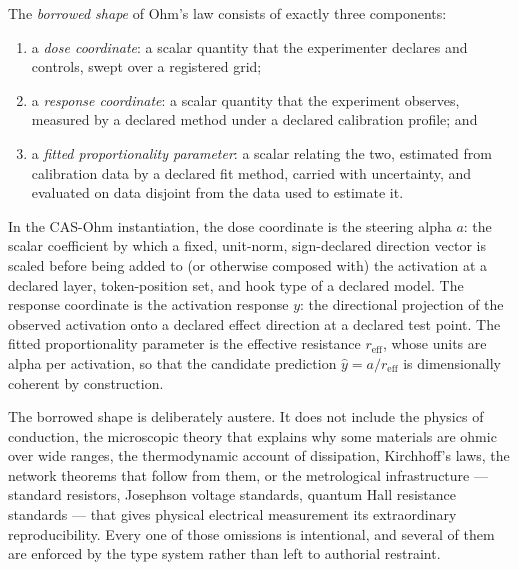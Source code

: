 \begin{definition}\label{ch01:def:shape}
The \emph{borrowed shape} of Ohm's law consists of exactly three components:
\begin{enumerate}
\item a \emph{dose coordinate}: a scalar quantity that the experimenter declares and controls, swept over a registered grid;
\item a \emph{response coordinate}: a scalar quantity that the experiment observes, measured by a declared method under a declared calibration profile; and
\item a \emph{fitted proportionality parameter}: a scalar relating the two, estimated from calibration data by a declared fit method, carried with uncertainty, and evaluated on data disjoint from the data used to estimate it.
\end{enumerate}
\end{definition}

In the CAS-Ohm instantiation, the dose coordinate is the steering alpha $a$: the scalar coefficient by which a fixed, unit-norm, sign-declared direction vector is scaled before being added to (or otherwise composed with) the activation at a declared layer, token-position set, and hook type of a declared model. The response coordinate is the activation response $y$: the directional projection of the observed activation onto a declared effect direction at a declared test point. The fitted proportionality parameter is the effective resistance $r_{\mathrm{eff}}$, whose units are alpha per activation, so that the candidate prediction $\hat{y} = a / r_{\mathrm{eff}}$ is dimensionally coherent by construction.

The borrowed shape is deliberately austere. It does not include the physics of conduction, the microscopic theory that explains why some materials are ohmic over wide ranges, the thermodynamic account of dissipation, Kirchhoff's laws, the network theorems that follow from them, or the metrological infrastructure --- standard resistors, Josephson voltage standards, quantum Hall resistance standards --- that gives physical electrical measurement its extraordinary reproducibility. Every one of those omissions is intentional, and several of them are enforced by the type system rather than left to authorial restraint.

